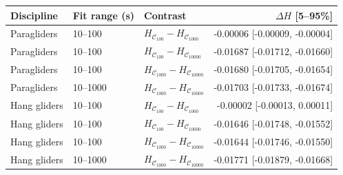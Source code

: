\begin{tabular}{lllr}
\toprule
Discipline & Fit range (s) & Contrast & $\Delta H$ [5--95\%]\\
\midrule
Paragliders & 10--100 & $H_{\mathcal C_{100}}-H_{\mathcal C_{1000}}$ & -0.00006 [-0.00009, -0.00004]\\
Paragliders & 10--100 & $H_{\mathcal C_{100}}-H_{\mathcal C_{10000}}$ & -0.01687 [-0.01712, -0.01660]\\
Paragliders & 10--100 & $H_{\mathcal C_{1000}}-H_{\mathcal C_{10000}}$ & -0.01680 [-0.01705, -0.01654]\\
Paragliders & 10--1000 & $H_{\mathcal C_{1000}}-H_{\mathcal C_{10000}}$ & -0.01703 [-0.01733, -0.01674]\\
Hang gliders & 10--100 & $H_{\mathcal C_{100}}-H_{\mathcal C_{1000}}$ & -0.00002 [-0.00013, 0.00011]\\
Hang gliders & 10--100 & $H_{\mathcal C_{100}}-H_{\mathcal C_{10000}}$ & -0.01646 [-0.01748, -0.01552]\\
Hang gliders & 10--100 & $H_{\mathcal C_{1000}}-H_{\mathcal C_{10000}}$ & -0.01644 [-0.01746, -0.01550]\\
Hang gliders & 10--1000 & $H_{\mathcal C_{1000}}-H_{\mathcal C_{10000}}$ & -0.01771 [-0.01879, -0.01668]\\
\bottomrule
\end{tabular}
